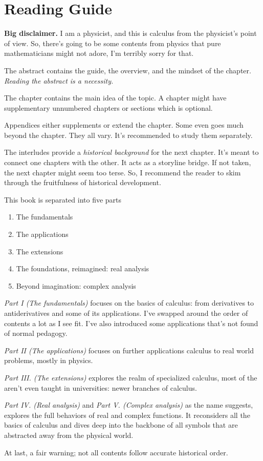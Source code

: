 \chapter*{Reading Guide}

\textbf{Big disclaimer.} I am a physicist, and this is calculus from the physicist's point of view. So, there's going to be some contents from physics that pure mathematicians might not adore, I'm terribly sorry for that. 

The abstract contains the guide, the overview, and the mindset of the chapter. \emph{Reading the abstract is a necessity.}

The chapter contains the main idea of the topic. A chapter might have supplementary unnumbered chapters or sections which is optional.

Appendices either supplements or extend the chapter. Some even goes much beyond the chapter. They all vary. It's recommended to study them separately.

The interludes provide a \emph{historical background} for the next chapter. It's meant to connect one chapters with the other. It acts as a storyline bridge. If not taken, the next chapter might seem too terse. So, I recommend the reader to skim through the fruitfulness of historical development.

This book is separated into five parts
\begin{enumerate}[noitemsep, label = {\Roman*}]
    \item The fundamentals
    \item The applications
    \item The extensions
    \item The foundations, reimagined: real analysis
    \item Beyond imagination: complex analysis
\end{enumerate}

\emph{Part I (The fundamentals)} focuses on the basics of calculus: from derivatives to antiderivatives and some of its applications. I've swapped around the order of contents a lot as I see fit. I've also introduced some applications that's not found of normal pedagogy.

\emph{Part II (The applications)} focuses on further applications calculus to real world problems, mostly in physics.

\emph{Part III. (The extensions)} explores the realm of specialized calculus, most of the aren't even taught in universities: newer branches of calculus.

\emph{Part IV. (Real analysis)} and \emph{Part V. (Complex analysis)} as the name suggests, explores the full behaviors of real and complex functions. It reconsiders all the basics of calculus and dives deep into the backbone of all symbols that are abstracted away from the physical world.

At last, a fair warning; not all contents follow accurate historical order.